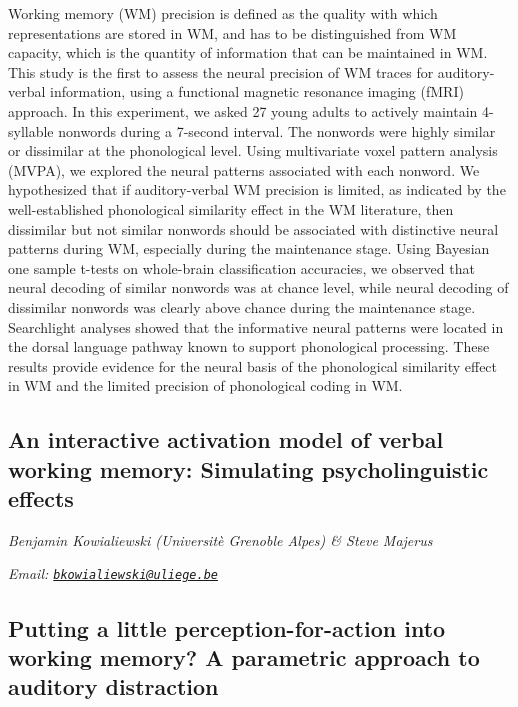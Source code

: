 \documentclass[
  12pt,
]{book}
\begin{document}
Working memory (WM) precision is defined as the quality with which representations are stored in WM, and has to be distinguished from WM capacity, which is the quantity of information that can be maintained in WM. This study is the first to assess the neural precision of WM traces for auditory-verbal information, using a functional magnetic resonance imaging (fMRI) approach. In this experiment, we asked 27 young adults to actively maintain 4-syllable nonwords during a 7-second interval. The nonwords were highly similar or dissimilar at the phonological level. Using multivariate voxel pattern analysis (MVPA), we explored the neural patterns associated with each nonword. We hypothesized that if auditory-verbal WM precision is limited, as indicated by the well-established phonological similarity effect in the WM literature, then dissimilar but not similar nonwords should be associated with distinctive neural patterns during WM, especially during the maintenance stage. Using Bayesian one sample t-tests on whole-brain classification accuracies, we observed that neural decoding of similar nonwords was at chance level, while neural decoding of dissimilar nonwords was clearly above chance during the maintenance stage. Searchlight analyses showed that the informative neural patterns were located in the dorsal language pathway known to support phonological processing. These results provide evidence for the neural basis of the phonological similarity effect in WM and the limited precision of phonological coding in WM.

\hypertarget{an-interactive-activation-model-of-verbal-working-memory-simulating-psycholinguistic-effects}{%
\subsection{An interactive activation model of verbal working memory: Simulating psycholinguistic effects}\label{an-interactive-activation-model-of-verbal-working-memory-simulating-psycholinguistic-effects}}

\emph{Benjamin Kowialiewski (Universitè Grenoble Alpes) \& Steve Majerus}

\emph{Email: \href{mailto:bkowialiewski@uliege.be}{\nolinkurl{bkowialiewski@uliege.be}}}

\hypertarget{putting-a-little-perception-for-action-into-working-memory-a-parametric-approach-to-auditory-distraction}{%
\subsection{Putting a little perception-for-action into working memory? A parametric approach to auditory distraction}\label{putting-a-little-perception-for-action-into-working-memory-a-parametric-approach-to-auditory-distraction}}
\end{document}
